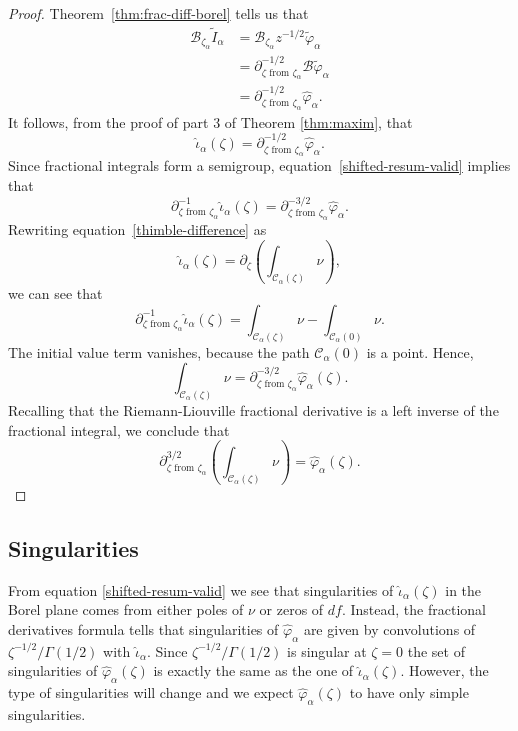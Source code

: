 \documentclass[11pt,a4paper,twoside,leqno,noamsfonts]{amsart}
\numberwithin{equation}{section}
\begin{document}
\begin{proof}
Theorem~\ref{thm:frac-diff-borel} tells us that
\begin{align*}
\mathcal{B}_{\zeta_\alpha} \tilde{I}_\alpha & = \mathcal{B}_{\zeta_\alpha} z^{-1/2} \tilde{\varphi}_\alpha \\
& = \partial^{-1/2}_{\zeta \text{ from } \zeta_\alpha} \mathcal{B} \tilde{\varphi}_\alpha \\
& = \partial^{-1/2}_{\zeta \text{ from } \zeta_\alpha} \hat{\varphi}_\alpha.
\end{align*}
It follows, from the proof of part $3$ of Theorem \ref{thm:maxim}, that
\begin{equation}\label{shifted-resum-valid}
\hat{\iota}_\alpha(\zeta) = \partial^{-1/2}_{\zeta \text{ from } \zeta_\alpha} \hat{\varphi}_\alpha.
\end{equation}
Since fractional integrals form a semigroup, equation~\eqref{shifted-resum-valid} implies that
\[ \partial^{-1}_{\zeta \text{ from } \zeta_\alpha} \hat{\iota}_\alpha(\zeta) = \partial^{-3/2}_{\zeta \text{ from } \zeta_\alpha} \hat{\varphi}_\alpha. \]
Rewriting equation~\eqref{thimble-difference} as
\[ \hat{\iota}_\alpha(\zeta) = \partial_\zeta \left( \int_{\mathcal{C}_\alpha(\zeta)} \nu \right), \]
we can see that
\[ \partial^{-1}_{\zeta \text{ from } \zeta_\alpha} \hat{\iota}_\alpha(\zeta) = \int_{\mathcal{C}_\alpha(\zeta)} \nu - \int_{\mathcal{C}_\alpha(0)} \nu. \]
The initial value term vanishes, because the path $\mathcal{C}_\alpha(0)$ is a point. Hence,
\[ \int_{\mathcal{C}_\alpha(\zeta)} \nu = \partial^{-3/2}_{\zeta \text{ from } \zeta_\alpha} \hat{\varphi}_\alpha(\zeta). \]
Recalling that the Riemann-Liouville fractional derivative is a left inverse of the fractional integral, we conclude that
\[ \partial^{3/2}_{\zeta \text{ from } \zeta_\alpha} \left( \int_{\mathcal{C}_\alpha(\zeta)} \nu \right) = \hat{\varphi}_\alpha(\zeta). \]
\end{proof}


\subsection{Singularities} 
From equation \eqref{shifted-resum-valid} we see that singularities of $\hat{\iota}_{\alpha}(\zeta)$ in the Borel plane comes from either poles of $\nu$ or zeros of $df$. Instead, the fractional derivatives formula tells that singularities of $\hat{\varphi}_\alpha$ are given by convolutions of $\zeta^{-1/2}/\Gamma(1/2)$ with $\hat{\iota}_{\alpha}$. Since $\zeta^{-1/2}/\Gamma(1/2)$ is singular at $\zeta=0$ the set of singularities of $\hat{\varphi}_{\alpha}(\zeta)$ is exactly the same as the one of $\hat{\iota}_{\alpha}(\zeta)$. However, the type of singularities will change and we expect $\hat{\varphi}_{\alpha}(\zeta)$ to have only simple singularities.
\end{document}
